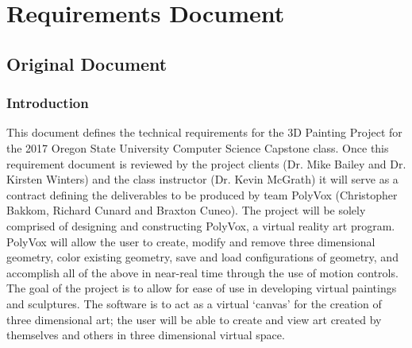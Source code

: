 \documentclass[onecolumn, draftclsnofoot,10pt, compsoc]{IEEEtran}
\newcounter{threesection}[subsubsection]
\begin{document}
\pagebreak
\section{Requirements Document}

\subsection{Original Document}

\subsubsection{Introduction}
This document defines the technical requirements for the 3D Painting Project for the 2017 Oregon State University Computer Science Capstone class.
Once this requirement document is reviewed by the project clients (Dr. Mike Bailey and Dr. Kirsten Winters) and the class instructor (Dr. Kevin McGrath) it will serve as a contract defining the deliverables to be produced by team PolyVox (Christopher Bakkom, Richard Cunard and Braxton Cuneo).
The project will be solely comprised of designing and constructing PolyVox, a virtual reality art program.
PolyVox will allow the user to create, modify and remove three dimensional geometry, color existing geometry, save and load configurations of geometry, and accomplish all of the above in near-real time through the use of motion controls.
The goal of the project is to allow for ease of use in developing virtual paintings and sculptures. The software is to act as a virtual ‘canvas’ for the creation of three dimensional art; the user will be able to create and view art created by themselves and others in three dimensional virtual space. 
\end{document}
